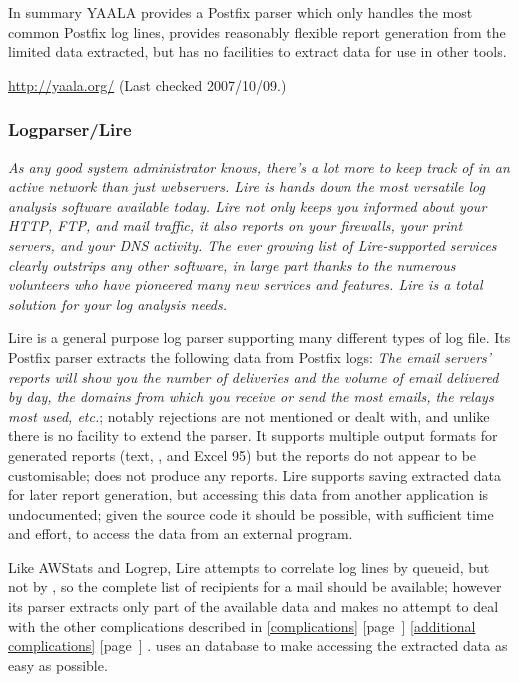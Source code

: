 \documentclass[a4paper,12pt,draft]{article}
\newcommand{\parsername}{\PLP{}}
\newcommand{\refwithpage}[1]{%
    \empty{}\ref{#1} [page~\pageref{#1}]%
}
\newcommand{\sectionref}[1]{%
    \textsection{}\refwithpage{#1}%
}
\begin{document}
In summary YAALA provides a Postfix parser which only handles the most
common Postfix log lines, provides reasonably flexible report generation
from the limited data extracted, but has no facilities to extract data for
use in other tools.

\url{http://yaala.org/} \newline (Last checked 2007/10/09.)

\subsubsection{Logparser/Lire}

\textit{As any good system administrator knows, there's a lot more to keep
track of in an active network than just webservers. Lire is hands down the
most versatile log analysis software available today. Lire not only keeps
you informed about your HTTP, FTP, and mail traffic, it also reports on
your firewalls, your print servers, and your DNS activity. The ever growing
list of Lire-supported services clearly outstrips any other software, in
large part thanks to the numerous volunteers who have pioneered many new
services and features. Lire is a total solution for your log analysis
needs.\/}

Lire is a general purpose log parser supporting many different types of log
file.  Its Postfix parser extracts the following data from Postfix logs:
\textit{The email servers' reports will show you the number of deliveries
and the volume of email delivered by day, the domains from which you
receive or send the most emails, the relays most used, etc.\/}; notably
rejections are not mentioned or dealt with, and unlike \parsername{} there
is no facility to extend the parser.  It supports multiple output formats
for generated reports (text, \HTML{}, \PDF{} and Excel 95) but the reports
do not appear to be customisable; \parsername{} does not produce any
reports.  Lire supports saving extracted data for later report generation,
but accessing this data from another application is undocumented; given the
source code it should be possible, with sufficient time and effort, to
access the data from an external program.

Like AWStats and Logrep, Lire attempts to correlate log lines by queueid,
but not by \pid{}, so the complete list of recipients for a mail should be
available; however its parser extracts only part of the available data and
makes no attempt to deal with the other complications described in
\sectionref{complications} \sectionref{additional complications}.
\parsername{} uses an \SQL{} database to make accessing the extracted data
as easy as possible.
\end{document}
